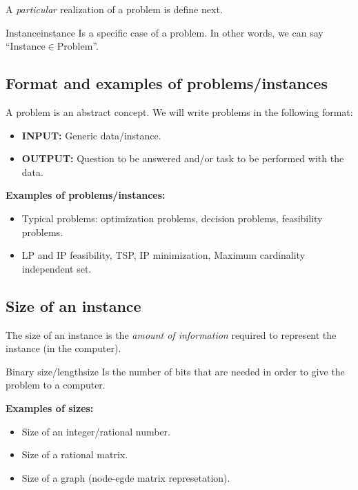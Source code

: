 A {\em particular} realization of a problem is define next.

\begin{definition}{Instance}{instance}
Is a specific case of a problem. In other words, we can say ``Instance$\in$Problem''.
\end{definition}

\subsection{Format and examples of problems/instances}

A problem is an abstract concept. We will write problems in the following format:
\begin{itemize}
	\item {\bf INPUT:} Generic data/instance.
	\item {\bf OUTPUT:} Question to be answered and/or task to be performed with the data.
\end{itemize}


{\bf Examples of problems/instances:}
	\begin{itemize}
	  \item Typical problems: optimization problems, decision problems, feasibility problems.
		\item LP and IP feasibility, TSP, IP minimization, Maximum cardinality independent set.
	\end{itemize}
	
	\subsection{Size of an instance}
	
The size of an instance is the {\em amount of information} required to represent the instance (in the computer).	
	
\begin{definition}{Binary size/length}{size}
Is the number of bits that are needed in order to give the problem to a computer.
\end{definition}	
	
{\bf Examples of sizes:}
	\begin{itemize}
		\item Size of an integer/rational number.
		\item Size of a rational matrix.
		\item Size of a graph (node-egde matrix represetation).
	\end{itemize}

